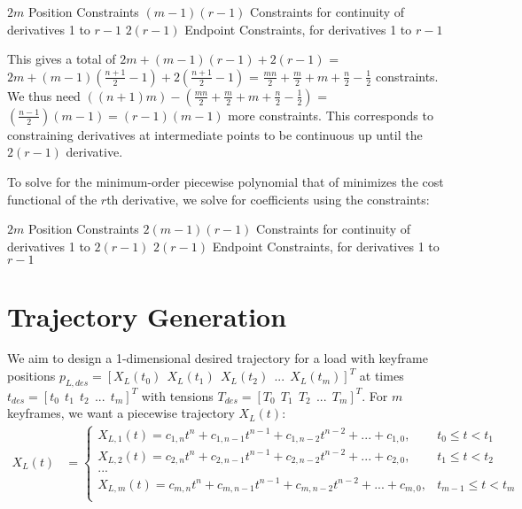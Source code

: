\documentclass[11pt]{article}
\begin{document}
\mbox{} \newline
$2m$ Position Constraints \newline
$(m-1)(r-1)$ Constraints for continuity of derivatives 1 to $r-1$ \newline
$2(r-1)$ Endpoint Constraints, for derivatives 1 to $r-1$ \newline

This gives a total of $2m+(m-1)(r-1)+2(r-1)$ = $2m+(m-1)(\frac{n+1}{2}-1) + 2(\frac{n+1}{2}-1)$ = $\frac{mn}{2}+\frac{m}{2}+m+\frac{n}{2}-\frac{1}{2}$ constraints. We thus need $\left( (n+1)m \right) - \left( \frac{mn}{2}+\frac{m}{2}+m+\frac{n}{2}-\frac{1}{2} \right)$ = $(\frac{n-1}{2})(m-1) = (r-1)(m-1)$ more constraints. This corresponds to constraining derivatives at intermediate points to be continuous up until the $2(r-1)$ derivative. 

\mbox{} \newline
To solve for the minimum-order piecewise polynomial that of minimizes the cost functional of the $r$th derivative, we solve for coefficients using the constraints:

\mbox{} \newline
$2m$ Position Constraints \newline
$2(m-1)(r-1)$ Constraints for continuity of derivatives 1 to $2(r-1)$ \newline
$2(r-1)$ Endpoint Constraints, for derivatives 1 to $r-1$ \newline





\newpage
\section{Trajectory Generation} 
We aim to design a 1-dimensional desired trajectory for a load with keyframe positions $p_{L, des} = [X_L(t_0) \ \ X_L(t_1) \ \ X_L(t_2) \ \ ... \ \ X_L(t_m)]^T$ at times $t_{des} = [t_0 \ \ t_1 \ \ t_2 \ \ ... \ \ t_m]^T$ with tensions $T_{des} = [T_0 \ \ T_1 \ \ T_2 \ \ ... \ \ T_m]^T$. For $m$ keyframes, we want a piecewise trajectory $X_L(t)$:
\begin{align*}
X_L(t) &= 
\begin{cases}
    X_{L,1} (t) = c_{1, n} t^n + c_{1, n-1} t^{n-1} + c_{1, n-2} t^{n-2} + ... + c_{1, 0}, & t_0 \le t < t_1 \\
    X_{L,2} (t) = c_{2, n} t^n + c_{2, n-1} t^{n-1} + c_{2, n-2} t^{n-2} + ... + c_{2, 0}, & t_1 \le t < t_2 \\
    ... \\
    X_{L,m} (t) = c_{m, n} t^n + c_{m, n-1} t^{n-1} + c_{m, n-2} t^{n-2} + ... + c_{m, 0}, & t_{m-1} \le t < t_m \\
\end{cases}
\end{align*}
\end{document}
